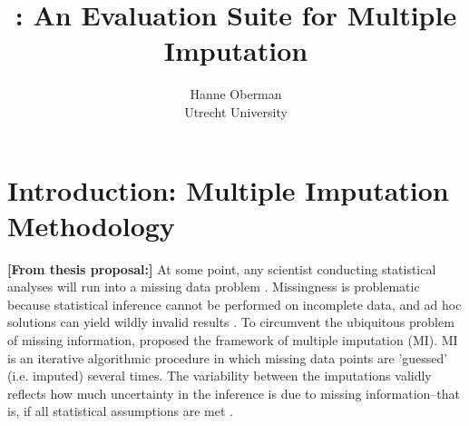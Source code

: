 \documentclass[article]{jss}
\author{Hanne Oberman\\Utrecht University}
\title{\pkg{ShinyMICE}: An Evaluation Suite for Multiple Imputation}
\newcommand{\fct}[1]{\code{#1()}}
\begin{document}


\section[Introduction: Multiple Imputation Methodology]{Introduction: Multiple Imputation Methodology} \label{sec:intro} %

% 

\textbf{[From thesis proposal:]} At some point, any scientist conducting statistical analyses will run into a missing data problem \citep{alli02}. Missingness is problematic because statistical inference cannot be performed on incomplete data, and  ad hoc solutions can yield wildly invalid results \citep{buur18}. To circumvent the ubiquitous problem of missing information, \cite{rubin87} proposed the framework of multiple imputation (MI). MI is an iterative algorithmic procedure in which missing data points are 'guessed' (i.e. imputed) several times. The variability between the imputations validly reflects how much uncertainty in the inference is due to missing information--that is, if all statistical assumptions are met \cite{rubin87}.
\end{document}
